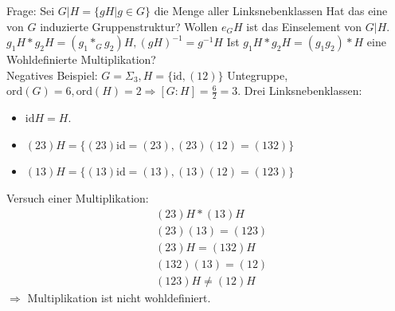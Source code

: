 \documentclass{article}
\newcommand{\ord}{\text{ord}}
\newcommand{\id}{\text{id}}
\begin{document}
\color{blue}
Frage: Sei $G|H=\{gH|g\in G\}$ die Menge aller
Linksnebenklassen Hat das eine von $G$ induzierte
Gruppenstruktur? Wollen $e_GH$ ist das Einselement
von $G|H$.\\
$g_1H*g_2H=(g_1*_Gg_2)H,(gH)^{-1}=g^{-1}H$
Ist $g_1H*g_2H=(g_1g_2)*H$ eine Wohldefinierte
Multiplikation?\\
Negatives Beispiel: $G=\Sigma_3,H=\{\id,(12)\}$ Untegruppe,
$\ord(G)=6,\ord(H)=2\Rightarrow[G:H]=\frac{6}{2}=3$.
Drei Linksnebenklassen:
\begin{itemize}
    \item $\id H=H$.
    \item $(23)H=\{(23)\id=(23), (23)(12)=(132)\}$
    \item $(13)H=\{(13)\id=(13), (13)(12)=(123)\}$
\end{itemize}
Versuch einer Multiplikation:
\begin{align*}
    &(23)H*(13)H\\
    &(23)(13)=(123)\\
    &(23)H=(132)H\\
    &(132)(13)=(12)\\
    &(123)H\neq(12)H
\end{align*}
$\Rightarrow$ Multiplikation ist nicht wohldefiniert.
\end{document}
